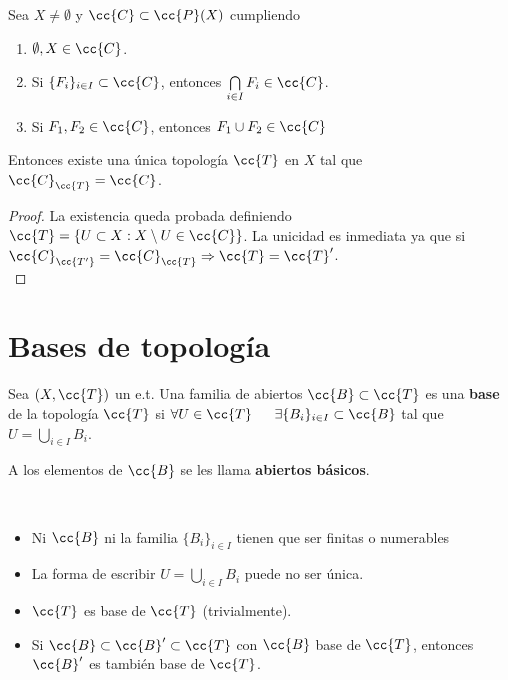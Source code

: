 \begin{teo}
    Sea $X\neq \emptyset$ y $\cc{C}\subset \cc{P}(X)$ cumpliendo
    \begin{enumerate}
        \item[\apuntar{C1}] $\emptyset, X \in \cc{C}$.
        \item[\apuntar{C2}] Si $\{F_i\}_{i\in I}\subset \cc{C}$, entonces $\bigcap\limits_{i\in I}F_i \in \cc{C}$.
        \item[\apuntar{C3}] Si $F_1, F_2 \in \cc{C}$, entonces $F_1 \cup F_2 \in \cc{C}$
    \end{enumerate}

    Entonces existe una única topología $\cc{T}$ en $X$ tal que $\cc{C}_{\cc{T}}=\cc{C}$.

    \begin{proof}
        La existencia queda probada definiendo $\cc{T}=\{U\subset X : X \setminus U \in \cc{C}\}$.
        La unicidad es inmediata ya que si $\cc{C}_{\cc{T'}}=\cc{C}_{\cc{T}}\Rightarrow \cc{T}=\cc{T}'$.\\
    \end{proof}
\end{teo}

\section{Bases de topología}

\begin{definicion}
    Sea $(X,\cc{T})$ un e.t. Una familia de abiertos $\cc{B}\subset \cc{T}$ es una \textbf{base} de la topología $\cc{T}$ si $\forall U \in \cc{T}$\ \ \ $\exists \{B_i\}_{i\in I}\subset \cc{B}$ tal que $U=\bigcup\limits_{i\in I}B_i$.

    A los elementos de $\cc{B}$ se les llama \textbf{abiertos básicos}.
    \endsquare
\end{definicion}

\begin{observacion}\
    \begin{itemize}
        \item Ni $\cc{B}$ ni la familia $\{B_i\}_{i\in I}$ tienen que ser finitas o numerables
        \item La forma de escribir $U=\bigcup\limits_{i\in I} B_i$ puede no ser única.
        \item $\cc{T}$ es base de $\cc{T}$ (trivialmente).
        \item Si $\cc{B}\subset \cc{B}'\subset \cc{T}$ con $\cc{B}$ base de $\cc{T}$, entonces $\cc{B}'$ es también base de $\cc{T}$.
    \end{itemize}
    \endsquare
\end{observacion}

